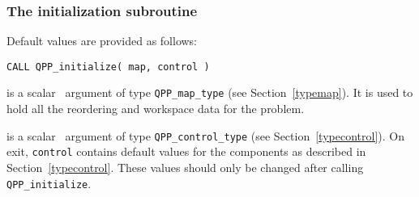 \documentclass{galahad}
\newcommand{\packagename}{QPP}
\begin{document}

\subsubsection{The initialization subroutine}\label{subinit}
 Default values are provided as follows:
\vspace*{1mm}

\hspace{8mm}
{\tt CALL \packagename\_initialize( map, control )}

\vspace*{-2mm}
\begin{description}

 is a scalar \intentout\ argument of type
{\tt \packagename\_map\_type} (see Section~\ref{typemap}).
It is used to hold all the reordering and workspace data for the problem.

 is a scalar \intentout\ argument of type
{\tt \packagename\_control\_type}
(see Section~\ref{typecontrol}).
On exit, {\tt control} contains default values for the components as
described in Section~\ref{typecontrol}.
These values should only be changed after calling
{\tt \packagename\_initialize}.

\end{description}

\end{document}
